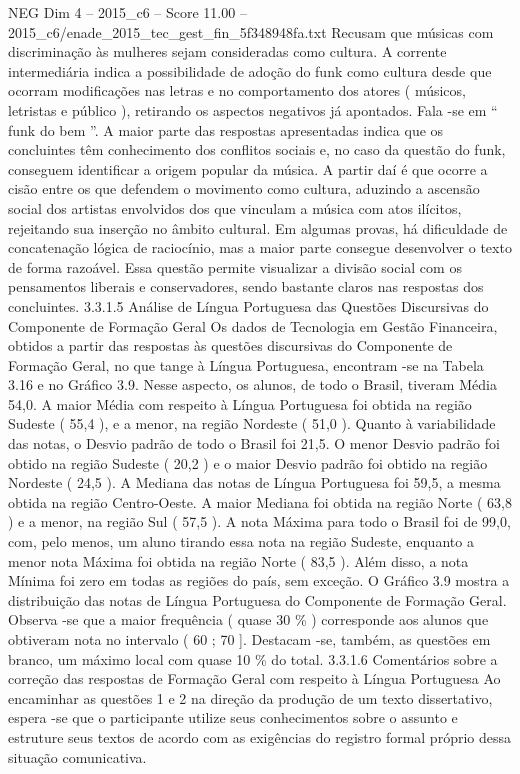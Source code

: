 \begin{textsample}{NEG Dim 4 – 2015\_c6 – Score 11.00 – 2015\_c6/enade\_2015\_tec\_gest\_fin\_5f348948fa.txt}
Recusam que músicas com discriminação às mulheres sejam consideradas como cultura.
A corrente intermediária indica a possibilidade de adoção do funk como cultura desde que ocorram modificações nas letras e no comportamento dos atores ( músicos, letristas e público ), retirando os aspectos negativos já apontados.
Fala -se em “ funk do bem ”.
A maior parte das respostas apresentadas indica que os concluintes têm conhecimento dos conflitos sociais e, no caso da questão do funk, conseguem identificar a origem popular da música.
A partir daí é que ocorre a cisão entre os que defendem o movimento como cultura, aduzindo a ascensão social dos artistas envolvidos dos que vinculam a música com atos ilícitos, rejeitando sua inserção no âmbito cultural.
Em algumas provas, há dificuldade de concatenação lógica de raciocínio, mas a maior parte consegue desenvolver o texto de forma razoável.
Essa questão permite visualizar a divisão social com os pensamentos liberais e conservadores, sendo bastante claros nas respostas dos concluintes. 3.3.1.5 Análise de Língua Portuguesa das Questões Discursivas do Componente de Formação Geral Os dados de Tecnologia em Gestão Financeira, obtidos a partir das respostas às questões discursivas do Componente de Formação Geral, no que tange à Língua Portuguesa, encontram -se na Tabela 3.16 e no Gráfico 3.9.
Nesse aspecto, os alunos, de todo o Brasil, tiveram Média 54,0.
A maior Média com respeito à Língua Portuguesa foi obtida na região Sudeste ( 55,4 ), e a menor, na região Nordeste ( 51,0 ).
Quanto à variabilidade das notas, o Desvio padrão de todo o Brasil foi 21,5.
O menor Desvio padrão foi obtido na região Sudeste ( 20,2 ) e o maior Desvio padrão foi obtido na região Nordeste ( 24,5 ).
A Mediana das notas de Língua Portuguesa foi 59,5, a mesma obtida na região Centro-Oeste.
A maior Mediana foi obtida na região Norte ( 63,8 ) e a menor, na região Sul ( 57,5 ).
A nota Máxima para todo o Brasil foi de 99,0, com, pelo menos, um aluno tirando essa nota na região Sudeste, enquanto a menor nota Máxima foi obtida na região Norte ( 83,5 ).
Além disso, a nota Mínima foi zero em todas as regiões do país, sem exceção.
O Gráfico 3.9 mostra a distribuição das notas de Língua Portuguesa do Componente de Formação Geral.
Observa -se que a maior frequência ( quase 30 \% ) corresponde aos alunos que obtiveram nota no intervalo ( 60 ; 70 ].
Destacam -se, também, as questões em branco, um máximo local com quase 10 \% do total. 3.3.1.6 Comentários sobre a correção das respostas de Formação Geral com respeito à Língua Portuguesa Ao encaminhar as questões 1 e 2 na direção da produção de um texto dissertativo, espera -se que o participante utilize seus conhecimentos sobre o assunto e estruture seus textos de acordo com as exigências do registro formal próprio dessa situação comunicativa.

\end{textsample}
